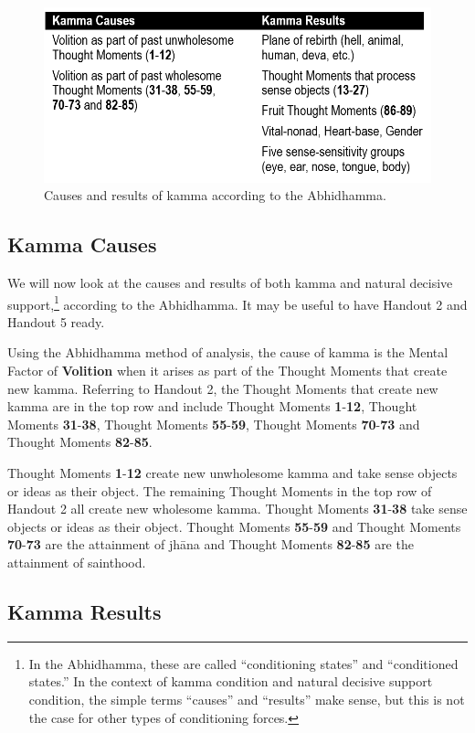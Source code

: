 \begin{figure}[h]
\centering
\includegraphics[width=0.7\linewidth]{./Diagrams/Kamma}
\caption{Causes and results of kamma according to the Abhidhamma.}
\label{fig:Kamma}
\end{figure}

\subsection*{Kamma Causes}

We will now look at the causes and results of both kamma and natural decisive support,\footnote{In the Abhidhamma, these are called “conditioning states” and “conditioned states.” In the context of kamma condition and natural decisive support condition, the simple terms “causes” and “results” make sense, but this is not the case for other types of conditioning forces.} according to the Abhidhamma. It may be useful to have Handout 2 and Handout 5 ready.

Using the Abhidhamma method of analysis, the cause of kamma is the Mental Factor of \textbf{Volition} when it arises as part of the Thought Moments that create new kamma. Referring to Handout 2, the Thought Moments that create new kamma are in the top row and include Thought Moments \textbf{1}-\textbf{12}, Thought Moments \textbf{31}-\textbf{38}, Thought Moments \textbf{55}-\textbf{59}, Thought Moments \textbf{70}-\textbf{73} and Thought Moments \textbf{82}-\textbf{85}.

Thought Moments \textbf{1}-\textbf{12} create new unwholesome kamma and take sense objects or ideas as their object. The remaining Thought Moments in the top row of Handout 2 all create new wholesome kamma. Thought Moments \textbf{31}-\textbf{38} take sense objects or ideas as their object. Thought Moments \textbf{55}-\textbf{59} and Thought Moments \textbf{70}-\textbf{73} are the attainment of jhāna and Thought Moments \textbf{82}-\textbf{85} are the attainment of sainthood.

\subsection*{Kamma Results}

